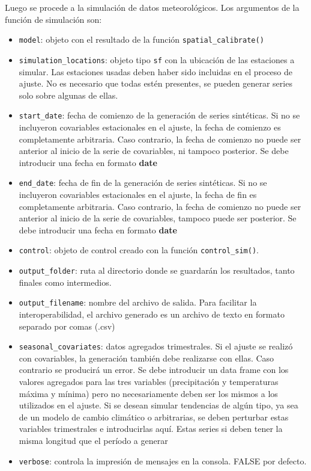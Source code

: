 \documentclass[
  12pt]{article}
\providecommand{\tightlist}{%
  \setlength{\itemsep}{0pt}\setlength{\parskip}{0pt}}
\begin{document}
Luego se procede a la simulación de datos meteorológicos. Los argumentos de la función de simulación son:

\begin{itemize}
\tightlist
\item
  \texttt{model}: objeto con el resultado de la función \texttt{spatial\_calibrate()}
\item
  \texttt{simulation\_locations}: objeto tipo \texttt{sf} con la ubicación de las estaciones a simular. Las estaciones usadas deben haber sido incluidas en el proceso de ajuste. No es necesario que todas estén presentes, se pueden generar series solo sobre algunas de ellas.
\item
  \texttt{start\_date}: fecha de comienzo de la generación de series sintéticas. Si no se incluyeron covariables estacionales en el ajuste, la fecha de comienzo es completamente arbitraria. Caso contrario, la fecha de comienzo no puede ser anterior al inicio de la serie de covariables, ni tampoco posterior. Se debe introducir una fecha en formato \textbf{date}
\item
  \texttt{end\_date}: fecha de fin de la generación de series sintéticas. Si no se incluyeron covariables estacionales en el ajuste, la fecha de fin es completamente arbitraria. Caso contrario, la fecha de comienzo no puede ser anterior al inicio de la serie de covariables, tampoco puede ser posterior. Se debe introducir una fecha en formato \textbf{date}
\item
  \texttt{control}: objeto de control creado con la función \texttt{control\_sim()}.
\item
  \texttt{output\_folder}: ruta al directorio donde se guardarán los resultados, tanto finales como intermedios.
\item
  \texttt{output\_filename}: nombre del archivo de salida. Para facilitar la interoperabilidad, el archivo generado es un archivo de texto en formato separado por comas (.csv)
\item
  \texttt{seasonal\_covariates}: datos agregados trimestrales. Si el ajuste se realizó con covariables, la generación también debe realizarse con ellas. Caso contrario se producirá un error. Se debe introducir un data frame con los valores agregados para las tres variables (precipitación y temperaturas máxima y mínima) pero no necesariamente deben ser los mismos a los utilizados en el ajuste. Si se desean simular tendencias de algún tipo, ya sea de un modelo de cambio climático o arbitrarias, se deben perturbar estas variables trimestrales e introducirlas aquí. Estas series si deben tener la misma longitud que el período a generar
\item
  \texttt{verbose}: controla la impresión de mensajes en la consola. FALSE por defecto.
\end{itemize}
\end{document}
